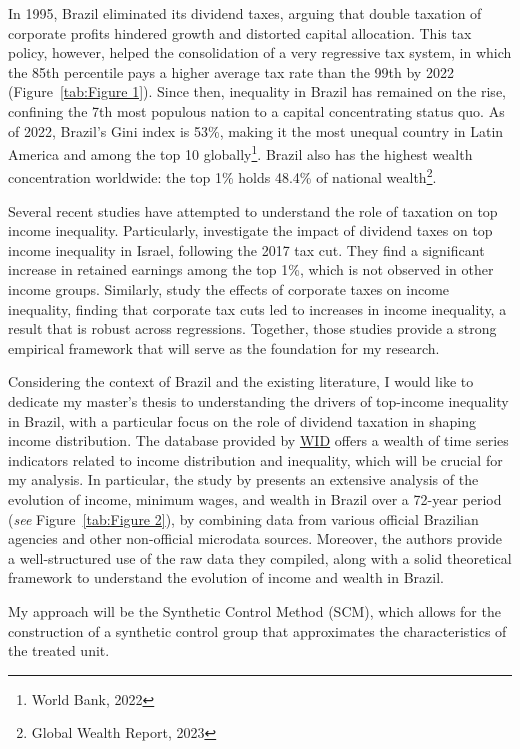 \documentclass[a4paper, 12pt]{article}
\begin{document}
In 1995, Brazil eliminated its dividend taxes, arguing that double taxation of corporate profits hindered growth and distorted capital allocation.
This tax policy, however, helped the consolidation of a very regressive tax system, in which the 85th percentile pays a higher average tax rate than the 99th by 2022 (Figure~\ref{tab:Figure 1}). 
Since then, inequality in Brazil has remained on the rise, confining the 7th most populous nation to a capital concentrating status quo. 
As of 2022, Brazil's Gini index is 53\%, making it the most unequal country in Latin America and among the top 10 globally\footnote{World Bank, 2022}.
Brazil also has the highest wealth concentration worldwide: the top 1\% holds 48.4\% of national wealth\footnote{Global Wealth Report, 2023}.
\par
Several recent studies have attempted to understand the role of taxation on top income inequality. 
Particularly, \cite{berman2024capital} investigate the impact of dividend taxes on top income inequality in Israel, following the 2017 tax cut. 
They find a significant increase in retained earnings among the top 1\%, which is not observed in other income groups.
Similarly, \cite{nallareddy2021corporate} study the effects of corporate taxes on income inequality, finding that corporate tax cuts led to increases in income inequality, a result that is robust across regressions.
Together, those studies provide a strong empirical framework that will serve as the foundation for my research.
\par
Considering the context of Brazil and the existing literature, I would like to dedicate my master’s thesis to understanding the drivers of top-income inequality in Brazil, with a particular focus on the role of dividend taxation in shaping income distribution.
The database provided by \href{https://wid.world/country/brazil/}{WID} offers a wealth of time series indicators related to income distribution and inequality, which will be crucial for my analysis.
In particular, the study by \cite{morgan2025distribution} presents an extensive analysis of the evolution of income, minimum wages, and wealth in Brazil over a 72-year period (\textit{see} Figure~\ref{tab:Figure 2}), by combining data from various official Brazilian agencies and other non-official microdata sources.
Moreover, the authors provide a well-structured use of the raw data they compiled, along with a solid theoretical framework to understand the evolution of income and wealth in Brazil.
\par    
My approach will be the Synthetic Control Method (SCM), which allows for the construction of a synthetic control group that approximates the characteristics of the treated unit.
\end{document}
